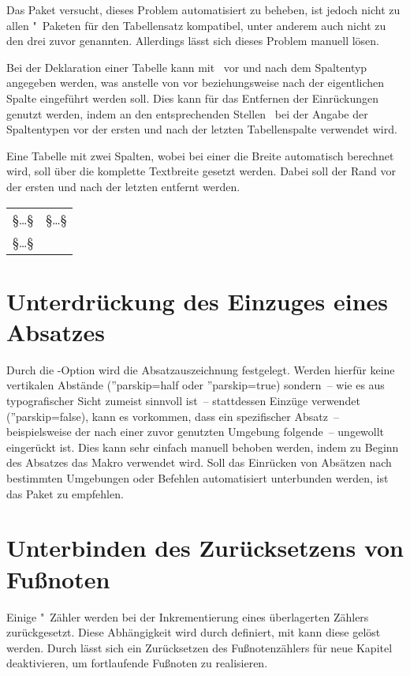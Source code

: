 Das Paket  versucht, dieses Problem automatisiert zu 
beheben, ist jedoch nicht zu allen "~Paketen für den 
Tabellensatz kompatibel, unter anderem auch nicht zu den drei zuvor genannten. 
Allerdings lässt sich dieses Problem manuell lösen. 

Bei der Deklaration einer Tabelle kann mit~\MPValue{\dots} vor und 
nach dem Spaltentyp angegeben werden, was anstelle von  vor 
beziehungsweise nach der eigentlichen Spalte eingeführt werden soll. Dies kann 
für das Entfernen der Einrückungen genutzt werden, indem an den entsprechenden 
Stellen~ bei der Angabe der Spaltentypen vor der ersten und 
nach der letzten Tabellenspalte verwendet wird.
%
\begin{Example}
Eine Tabelle mit zwei Spalten, wobei bei einer die Breite automatisch berechnet 
wird, soll über die komplette Textbreite gesetzt werden. Dabei soll der Rand 
vor der ersten und nach der letzten entfernt werden.
\begin{Code}[escapechar=§]
\begin{tabularx}{\textwidth}{@{}lX@{}}
§\dots§ & §\dots§ \tabularnewline
§\dots§
\end{tabularx}
\end{Code}
\end{Example}



\section{%
  Unterdrückung des Einzuges eines Absatzes%
}
%
Durch die \KOMAScript-Option  wird
die Absatzauszeichnung  festgelegt. Werden hierfür keine vertikalen Abstände 
(\Option''{parskip=half} oder \Option''{parskip=true}) sondern~-- wie es aus 
typografischer Sicht zumeist sinnvoll ist~-- stattdessen Einzüge verwendet 
(\Option''{parskip=false}), kann es vorkommen, dass ein spezifischer Absatz~-- 
beispielsweise der nach einer zuvor genutzten Umgebung folgende~-- ungewollt 
eingerückt ist. Dies kann sehr einfach manuell behoben werden, indem zu Beginn 
des Absatzes das Makro  verwendet wird. Soll das Einrücken von 
Absätzen nach bestimmten Umgebungen oder Befehlen automatisiert unterbunden 
werden, ist das Paket  zu empfehlen.



\section{%
  Unterbinden des Zurücksetzens von Fußnoten%
  \label{sec:tips:counter}%
}
%
Einige "~Zähler werden bei der Inkrementierung eines überlagerten 
Zählers zurückgesetzt. Diese Abhängigkeit wird durch  
definiert, mit  kann diese gelöst werden. Durch 
 lässt sich ein 
Zurücksetzen des Fußnotenzählers für neue Kapitel deaktivieren, um fortlaufende 
Fußnoten zu realisieren.



